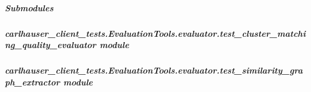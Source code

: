 \documentclass[letterpaper,10pt,english]{sphinxmanual}
\begin{document}
\subparagraph{Submodules}
\label{\detokenize{carlhauser_client_tests.EvaluationTools.evaluator:submodules}}

\subparagraph{carlhauser\_client\_tests.EvaluationTools.evaluator.test\_cluster\_matching\_quality\_evaluator module}
\label{\detokenize{carlhauser_client_tests.EvaluationTools.evaluator:carlhauser-client-tests-evaluationtools-evaluator-test-cluster-matching-quality-evaluator-module}}

\subparagraph{carlhauser\_client\_tests.EvaluationTools.evaluator.test\_similarity\_graph\_extractor module}
\label{\detokenize{carlhauser_client_tests.EvaluationTools.evaluator:module-carlhauser_client_tests.EvaluationTools.evaluator.test_similarity_graph_extractor}}\label{\detokenize{carlhauser_client_tests.EvaluationTools.evaluator:carlhauser-client-tests-evaluationtools-evaluator-test-similarity-graph-extractor-module}}
\end{document}
